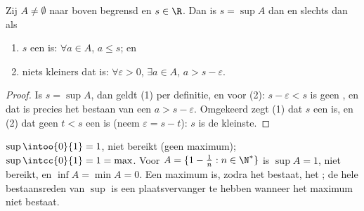 \begin{proposition}\label{prop:b1:reals:epsilon}
Zij $A \neq \emptyset$ naar boven begrensd en $s \in \R$. Dan is $s =
\sup A$ dan en slechts dan als
\begin{enumerate}
  \item $s$ een  is: $\forall a \in A$, $a \leq s$; en
  \item niets kleiners dat is: $\forall \varepsilon > 0$, $\exists a \in
        A$, $a > s - \varepsilon$.
\end{enumerate}
\end{proposition}

\begin{proof}
Is $s = \sup A$, dan geldt (1) per definitie, en voor (2): $s -
\varepsilon < s$ is geen , en dat is precies het bestaan van
een $a > s - \varepsilon$. Omgekeerd zegt (1) dat $s$ een  is,
en (2) dat geen $t < s$ een  is (neem $\varepsilon = s - t$):
$s$ is de kleinste.
\end{proof}

\begin{example}\label{ex:b1:reals:supexamples}
$\sup \intoo{0}{1} = 1$, niet bereikt (geen maximum); $\sup \intcc{0}{1}
= 1 = \max$. Voor $A = \{1 - \frac 1n : n \in \N^*\}$ is $\sup A = 1$,
niet bereikt, en $\inf A = \min A = 0$. Een maximum is, zodra het
bestaat, het ; de hele bestaansreden van $\sup$ is een
plaatsvervanger te hebben wanneer het maximum niet bestaat.
\end{example}

